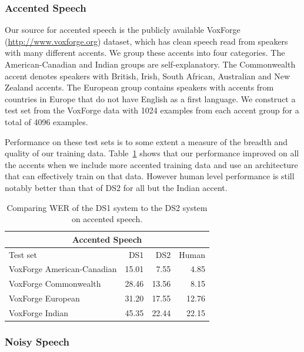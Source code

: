 \documentclass{article}
\begin{document}
\subsubsection{Accented Speech}

Our source for accented speech is the publicly available VoxForge (\url{http://www.voxforge.org}) dataset, which has clean speech read from speakers with many different accents. We group these accents into four categories. The American-Canadian and Indian groups are self-explanatory. The Commonwealth accent denotes speakers with British, Irish, South African, Australian and New Zealand accents. The European group contains speakers with accents from countries in Europe that do not have English as a first language. We construct a test set from the VoxForge data with 1024 examples from each accent group for a total of 4096 examples.

Performance on these test sets is to some extent a measure of the breadth and quality of our training data. Table~\ref{table:voxforge} shows that our performance improved on all the accents when we include more accented training data and use an architecture that can effectively train on that data. However human level performance is still notably better than that of DS2 for all but the Indian accent. 

\begin{table}
\centering
\begin{tabular}{l  r  r  r}
\toprule
\multicolumn{4}{c}{Accented Speech}\\
\midrule
Test set                   & DS1   & DS2 & Human \\
\midrule
VoxForge American-Canadian & 15.01 & 7.55  & 4.85 \\
VoxForge Commonwealth      & 28.46 & 13.56 & 8.15 \\
VoxForge European          & 31.20 & 17.55 & 12.76 \\
VoxForge Indian            & 45.35 & 22.44 & 22.15 \\
\bottomrule
\end{tabular}
\caption{Comparing WER of the DS1 system to the DS2 system on accented speech.}
\label{table:voxforge}
\end{table}

\subsubsection{Noisy Speech}
\end{document}
